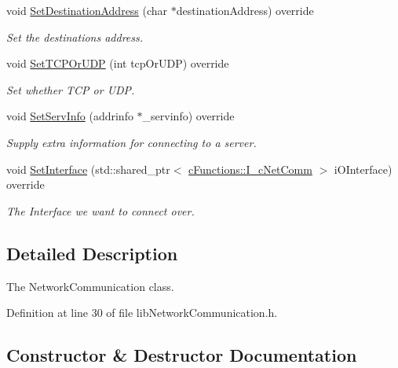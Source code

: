 \begin{DoxyCompactItemize}
void \mbox{\hyperlink{classlibNetworkCommunication_1_1libNetworkCommunication_a124f9b26150321f01f0998e558bf1d76}{Set\+Destination\+Address}} (char $\ast$destination\+Address) override
\begin{DoxyCompactList}\small\item\em Set the destination\textquotesingle{}s address. \end{DoxyCompactList}\item 
void \mbox{\hyperlink{classlibNetworkCommunication_1_1libNetworkCommunication_a620cba1d9e2204dc9ef6b6897e8b6736}{Set\+T\+C\+P\+Or\+U\+DP}} (int tcp\+Or\+U\+DP) override
\begin{DoxyCompactList}\small\item\em Set whether T\+CP or U\+DP. \end{DoxyCompactList}\item 
void \mbox{\hyperlink{classlibNetworkCommunication_1_1libNetworkCommunication_a5b95053e05ce720b7f18d275c65d6965}{Set\+Serv\+Info}} (addrinfo $\ast$\+\_\+servinfo) override
\begin{DoxyCompactList}\small\item\em Supply extra information for connecting to a server. \end{DoxyCompactList}\item 
void \mbox{\hyperlink{classlibNetworkCommunication_1_1libNetworkCommunication_a842d3bfc24ffe5175431f8aad5905266}{Set\+Interface}} (std\+::shared\+\_\+ptr$<$ \mbox{\hyperlink{classcFunctions_1_1I__cNetComm}{c\+Functions\+::\+I\+\_\+c\+Net\+Comm}} $>$ i\+O\+Interface) override
\begin{DoxyCompactList}\small\item\em The Interface we want to connect over. \end{DoxyCompactList}\end{DoxyCompactItemize}


\subsection{Detailed Description}
The Network\+Communication class. 

Definition at line 30 of file lib\+Network\+Communication.\+h.



\subsection{Constructor \& Destructor Documentation}
\mbox{\label{classlibNetworkCommunication_1_1libNetworkCommunication_a6f0822fd868efd3ec1f165e3846fec13}} 
